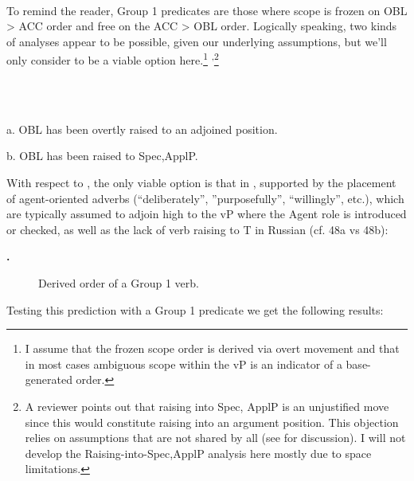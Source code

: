 \documentclass[output=paper,modfonts, nonflat]{langsci/langscibook}
\begin{document}
\\
To remind the reader, Group 1 predicates are those where scope is frozen on OBL > ACC order and free on the ACC > OBL order. Logically speaking, two kinds of analyses appear to be possible, given our underlying assumptions, but we’ll only consider  to be a viable option here.\footnote{I assume that the frozen scope order is derived via overt movement and that in most cases ambiguous scope within the vP is an indicator of a base-generated order.} \textsuperscript{,}\footnote{A reviewer points out that raising into Spec, ApplP is an unjustified move since this would constitute raising into an argument position. This objection relies on assumptions that are not shared by all (see \citealt{Larson2014} for discussion). I will not develop the Raising-into-Spec,ApplP analysis here mostly due to space limitations.}

\begin{styleinnerExample}
\ea%
    \label{ex:key:47}
    \gll\\
        \\
    \glt
    \z

          a.  OBL has been overtly raised to an adjoined position.
\end{styleinnerExample}

\begin{styleinnerExample}
  b.  OBL has been raised to Spec,ApplP.
\end{styleinnerExample}

With respect to , the only viable option is that in , supported by the placement of agent-oriented adverbs (“deliberately”, ”purposefully”, “willingly”, etc.), which are typically assumed to adjoin high to the vP where the Agent role is introduced or checked, as well as the lack of verb raising to T in Russian (cf. 48a vs 48b):

\textbf{.}

  
 
\begin{figure}
\caption{Derived order of a Group 1 verb.}
\label{fig:key:1}
\end{figure}

Testing this prediction with a Group 1 predicate we get the following results:
\end{document}
